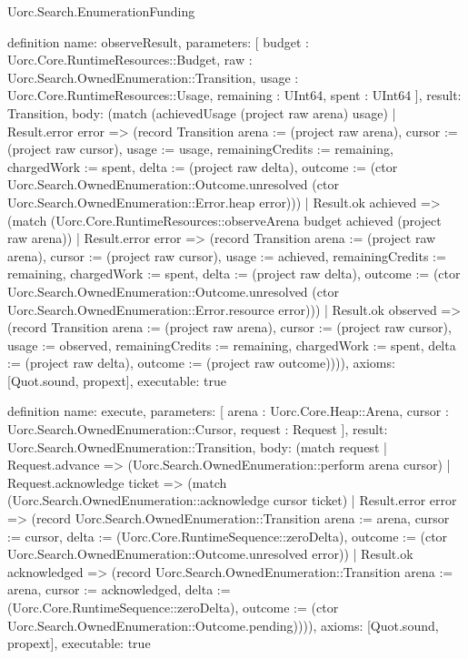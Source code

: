 \begin{lexlean}{Uorc.Search.EnumerationFunding}
\begin{semanticmodule}
definition{
  name: observeResult,
  parameters: [
    budget : Uorc.Core.RuntimeResources::Budget,
    raw : Uorc.Search.OwnedEnumeration::Transition,
    usage : Uorc.Core.RuntimeResources::Usage,
    remaining : UInt64,
    spent : UInt64
  ],
  result: Transition,
  body: (match (achievedUsage (project raw arena) usage)
    | Result.error error => (record Transition {arena := (project raw arena), cursor := (project raw cursor), usage := usage, remainingCredits := remaining, chargedWork := spent, delta := (project raw delta), outcome := (ctor Uorc.Search.OwnedEnumeration::Outcome.unresolved (ctor Uorc.Search.OwnedEnumeration::Error.heap error))})
    | Result.ok achieved => (match (Uorc.Core.RuntimeResources::observeArena budget achieved (project raw arena))
      | Result.error error => (record Transition {arena := (project raw arena), cursor := (project raw cursor), usage := achieved, remainingCredits := remaining, chargedWork := spent, delta := (project raw delta), outcome := (ctor Uorc.Search.OwnedEnumeration::Outcome.unresolved (ctor Uorc.Search.OwnedEnumeration::Error.resource error))})
      | Result.ok observed => (record Transition {arena := (project raw arena), cursor := (project raw cursor), usage := observed, remainingCredits := remaining, chargedWork := spent, delta := (project raw delta), outcome := (project raw outcome)}))),
  axioms: [Quot.sound, propext],
  executable: true
}

definition{
  name: execute,
  parameters: [
    arena : Uorc.Core.Heap::Arena,
    cursor : Uorc.Search.OwnedEnumeration::Cursor,
    request : Request
  ],
  result: Uorc.Search.OwnedEnumeration::Transition,
  body: (match request
    | Request.advance => (Uorc.Search.OwnedEnumeration::perform arena cursor)
    | Request.acknowledge ticket => (match (Uorc.Search.OwnedEnumeration::acknowledge cursor ticket)
      | Result.error error => (record Uorc.Search.OwnedEnumeration::Transition {arena := arena, cursor := cursor, delta := (Uorc.Core.RuntimeSequence::zeroDelta), outcome := (ctor Uorc.Search.OwnedEnumeration::Outcome.unresolved error)})
      | Result.ok acknowledged => (record Uorc.Search.OwnedEnumeration::Transition {arena := arena, cursor := acknowledged, delta := (Uorc.Core.RuntimeSequence::zeroDelta), outcome := (ctor Uorc.Search.OwnedEnumeration::Outcome.pending)}))),
  axioms: [Quot.sound, propext],
  executable: true
}


\end{semanticmodule}
\end{lexlean}
